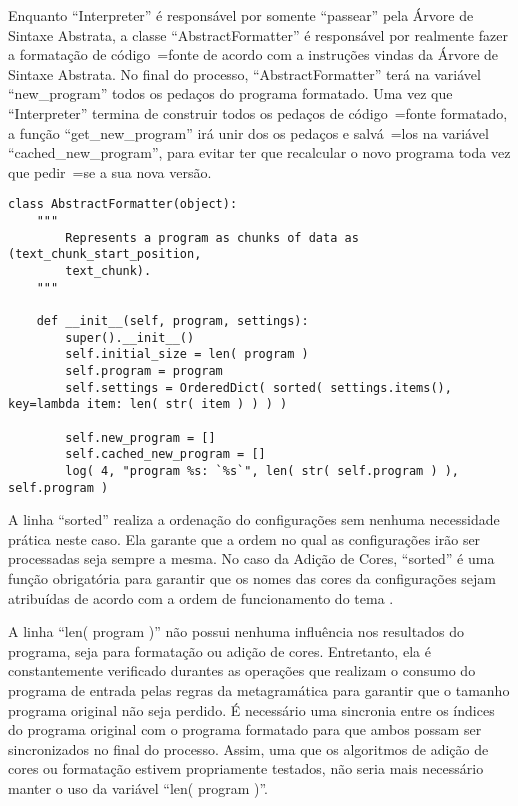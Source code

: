 Enquanto ``Interpreter'' é responsável por somente ``passear'' pela Árvore de Sintaxe Abstrata,
a classe ``AbstractFormatter''  é responsável por realmente fazer a formatação de código~=fonte de acordo com a instruções vindas da Árvore de Sintaxe Abstrata.
No final do processo,
``AbstractFormatter'' terá na variável ``new\_program'' todos os pedaços do programa formatado.
Uma vez que ``Interpreter'' termina de construir todos os pedaços de código~=fonte formatado,
a função ``get\_new\_program'' irá unir dos os pedaços e
salvá~=los na variável ``cached\_new\_program'',
para evitar ter que recalcular o novo programa toda vez que pedir~=se a sua nova versão.
\begin{lstlisting}[caption={Construtor de ``AbstractFormatter''},label={construtorDeParsedProgram},style=python_style]
class AbstractFormatter(object):
    """
        Represents a program as chunks of data as (text_chunk_start_position,
        text_chunk).
    """

    def __init__(self, program, settings):
        super().__init__()
        self.initial_size = len( program )
        self.program = program
        self.settings = OrderedDict( sorted( settings.items(), key=lambda item: len( str( item ) ) ) )

        self.new_program = []
        self.cached_new_program = []
        log( 4, "program %s: `%s`", len( str( self.program ) ), self.program )
\end{lstlisting}

A linha ``sorted'' realiza a ordenação do configurações sem nenhuma necessidade prática neste caso.
Ela garante que a ordem no qual as configurações irão ser processadas seja sempre a mesma.
No caso da Adição de Cores,
``sorted'' é uma função obrigatória para garantir que os nomes das cores da configurações sejam atribuídas de acordo com a ordem de funcionamento do tema \cite{vsCodeSyntaxHighlighthing,sublimeTextScopeNaming}.

A linha ``len( program )'' não possui nenhuma influência nos resultados do programa,
seja para formatação ou
adição de cores.
Entretanto,
ela é constantemente verificado durantes as operações que realizam o consumo do programa de entrada pelas regras da metagramática para garantir que o tamanho programa original não seja perdido.
É necessário uma sincronia entre os índices do programa original com o programa formatado para que ambos possam ser sincronizados no final do processo.
Assim,
uma que os algoritmos de adição de cores ou
formatação estivem propriamente testados,
não seria mais necessário manter o uso da variável ``len( program )''.

